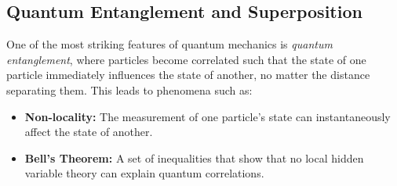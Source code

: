 \subsection{Quantum Entanglement and Superposition}
One of the most striking features of quantum mechanics is \textit{quantum entanglement}, where particles become correlated such that the state of one particle immediately influences the state of another, no matter the distance separating them. This leads to phenomena such as:
\begin{itemize}
    \item \textbf{Non-locality:} The measurement of one particle's state can instantaneously affect the state of another.
    \item \textbf{Bell's Theorem:} A set of inequalities that show that no local hidden variable theory can explain quantum correlations.
\end{itemize}


%

